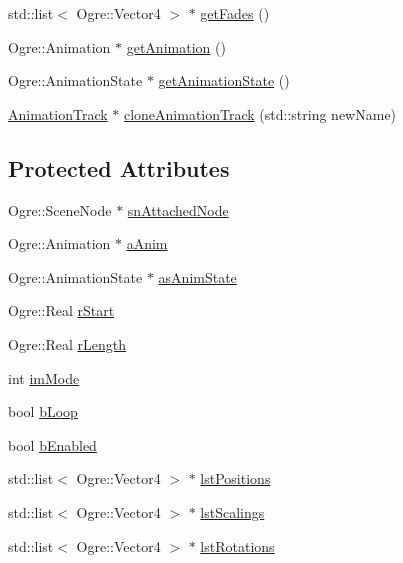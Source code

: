 \begin{DoxyCompactItemize}
\item 
std\-::list$<$ Ogre\-::\-Vector4 $>$ $\ast$ \hyperlink{class_rad_xml_1_1_animation_track_a90be4e8508c5770c839ef390715b3438}{get\-Fades} ()
\item 
Ogre\-::\-Animation $\ast$ \hyperlink{class_rad_xml_1_1_animation_track_a3ec0d432a6ac56704181e6d7902046bd}{get\-Animation} ()
\item 
Ogre\-::\-Animation\-State $\ast$ \hyperlink{class_rad_xml_1_1_animation_track_a65f18fd84f40a81ff08863551c6b0138}{get\-Animation\-State} ()
\item 
\hyperlink{class_rad_xml_1_1_animation_track}{Animation\-Track} $\ast$ \hyperlink{class_rad_xml_1_1_animation_track_a143dde96d14f23d8c87fca244947491f}{clone\-Animation\-Track} (std\-::string new\-Name)
\end{DoxyCompactItemize}
\subsection*{Protected Attributes}
\begin{DoxyCompactItemize}
\item 
Ogre\-::\-Scene\-Node $\ast$ \hyperlink{class_rad_xml_1_1_animation_track_ab33a825510229a825ee70e04e98394b4}{sn\-Attached\-Node}
\item 
Ogre\-::\-Animation $\ast$ \hyperlink{class_rad_xml_1_1_animation_track_aedaca3ab10e43a4cc34ca8db0d071c9a}{a\-Anim}
\item 
Ogre\-::\-Animation\-State $\ast$ \hyperlink{class_rad_xml_1_1_animation_track_aa6d8252cfb633be1b27bf9771d7e93d0}{as\-Anim\-State}
\item 
Ogre\-::\-Real \hyperlink{class_rad_xml_1_1_animation_track_acba15b201ccc5d3df7e418528b3f6bec}{r\-Start}
\item 
Ogre\-::\-Real \hyperlink{class_rad_xml_1_1_animation_track_a1f9d1c712054f85cba20dd4567c15dc4}{r\-Length}
\item 
int \hyperlink{class_rad_xml_1_1_animation_track_ad0cd379f4b57a720ff0e9d0690668b86}{im\-Mode}
\item 
bool \hyperlink{class_rad_xml_1_1_animation_track_a425fbf5b2d1b2987ae9a6ef87d0dfc73}{b\-Loop}
\item 
bool \hyperlink{class_rad_xml_1_1_animation_track_adfaaa24505acea2fba79af09e0ec5822}{b\-Enabled}
\item 
std\-::list$<$ Ogre\-::\-Vector4 $>$ $\ast$ \hyperlink{class_rad_xml_1_1_animation_track_aa34dee8a974a09f509eb31073d435160}{lst\-Positions}
\item 
std\-::list$<$ Ogre\-::\-Vector4 $>$ $\ast$ \hyperlink{class_rad_xml_1_1_animation_track_ad53819a43c900a2a84b4d9e6e80ee608}{lst\-Scalings}
\item 
std\-::list$<$ Ogre\-::\-Vector4 $>$ $\ast$ \hyperlink{class_rad_xml_1_1_animation_track_a3c0d1a6814e4fbacd9683d5bef849307}{lst\-Rotations}
\end{DoxyCompactItemize}


